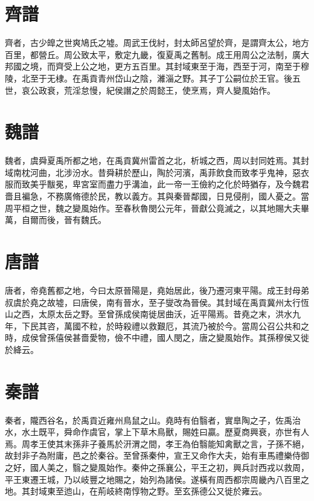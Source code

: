 \section*{齊譜}

齊者，古少皥之世爽鳩氏之墟。周武王伐紂，封太師呂望於齊，是謂齊太公，地方百里，都營丘。周公致太平，敷定九畿，復夏禹之舊制。成王用周公之法制，廣大邦國之境，而齊受上公之地，更方五百里。其封域東至于海，西至于河，南至于穆陵，北至于无棣。在禹貢青州岱山之陰，濰淄之野。其子丁公嗣位於王官。後五世，哀公政衰，荒淫怠慢，紀侯譖之於周懿王，使烹焉，齊人變風始作。

\section*{魏譜}

魏者，虞舜夏禹所都之地，在禹貢冀州雷首之北，析城之西，周以封同姓焉。其封域南枕河曲，北涉汾水。昔舜耕於歷山，陶於河濱，禹菲飲食而致孝乎鬼神，惡衣服而致美乎黻冕，卑宮室而盡力乎溝洫，此一帝一王儉約之化於時猶存，及今魏君嗇且褊急，不務廣脩德於民，教以義方。其與秦晉鄰國，日見侵削，國人憂之。當周平桓之世，魏之變風始作。至春秋魯閔公元年，晉獻公竟滅之，以其地賜大夫畢萬，自爾而後，晉有魏氏。

\section*{唐譜}

唐者，帝堯舊都之地，今曰太原晉陽是，堯始居此，後乃遷河東平陽。成王封母弟叔虞於堯之故墟，曰唐侯，南有晉水，至子燮改為晉侯。其封域在禹貢冀州太行恆山之西，太原太岳之野。至曾孫成侯南徙居曲沃，近平陽焉。昔堯之末，洪水九年，下民其咨，萬國不粒，於時殺禮以救艱厄，其流乃被於今。當周公召公共和之時，成侯曾孫僖侯甚嗇愛物，儉不中禮，國人閔之，唐之變風始作。其孫穆侯又徙於絳云。

\section*{秦譜}

秦者，隴西谷名，於禹貢近雍州鳥鼠之山。堯時有伯翳者，實臯陶之子，佐禹治水，水土既平，舜命作虞官，掌上下草木鳥獸，賜姓曰贏。歷夏商興衰，亦世有人焉。周孝王使其末孫非子養馬於汧渭之間，孝王為伯翳能知禽獸之言，子孫不絕，故封非子為附庸，邑之於秦谷。至曾孫秦仲，宣王又命作大夫，始有車馬禮樂侍御之好，國人美之，翳之變風始作。秦仲之孫襄公，平王之初，興兵討西戎以救周，平王東遷王城，乃以岐豐之地賜之，始列為諸侯。遂橫有周西都宗周畿內八百里之地。其封域東至迆山，在荊岐終南惇物之野。至玄孫德公又徙於雍云。

